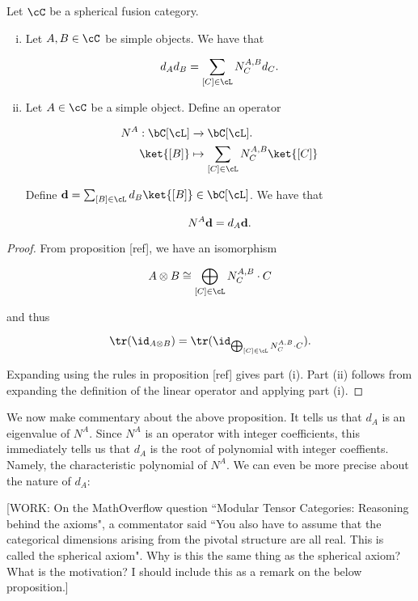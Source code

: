 \begin{prop} Let $\cC$ be a spherical fusion category.

\begin{enumerate}[(i)]
\item Let $A,B\in \cC$ be simple objects. We have that

$$d_Ad_B=\sum_{[C]\in \cL}N^{A,B}_C d_C.$$

\item Let $A\in \cC$ be a simple object. Define an operator

 \begin{align*}
N^{A}:\bC[\cL]&\xrightarrow{} \bC[\cL].\\
\ket{[B]}&\mapsto \sum_{[C]\in \cL} N^{A,B}_C \ket{[C]}
\end{align*}

Define $\bold{d} = \sum_{[B]\in \cL} d_{B}\ket{[B]}\in \bC[\cL]$. We have that

$$N^{A}\bold{d}=d_{A}\bold{d}.$$

\end{enumerate}

\end{prop}
\begin{proof} From proposition [ref], we have an isomorphism

$$A\otimes B \cong \bigoplus_{[C]\in \cL}N^{A,B}_{C}\cdot C$$

and thus

$$\tr(\id_{A\otimes B})=\tr(\id_{\bigoplus_{[C]\in \cL}N^{A,B}_{C}\cdot C}).$$

Expanding using the rules in proposition [ref] gives part (i). Part (ii) follows from expanding the definition of the linear operator and applying part (i).
\end{proof}

We now make commentary about the above proposition. It tells us that $d_A$ is an eigenvalue of $N^A$. Since $N^A$ is an operator with integer coefficients, this immediately tells us that $d_A$ is the root of polynomial with integer coeffients. Namely, the characteristic polynomial of $N^A$. We can even be more precise about the nature of $d_A$:

[WORK: On the MathOverflow question ``Modular Tensor Categories: Reasoning behind the axioms", a commentator said ``You also have to assume that the categorical dimensions arising from the pivotal structure are all real. This is called the spherical axiom". Why is this the same thing as the spherical axiom? What is the motivation? I should include this as a remark on the below proposition.]

